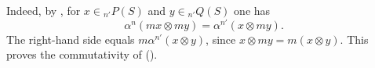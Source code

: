 \medskip
Indeed, by , for
$x\in{}_{n'}P(S)$ and $y\in{}_{n'}Q(S)$ one has
\[
 \alpha^n(mx\otimes my)=\alpha^{n'}(x\otimes my).
\]
The right-hand side equals
$m\alpha^{n'}(x\otimes y)$, since
$x\otimes my=m(x\otimes y)$.  This proves the commutativity of
().
